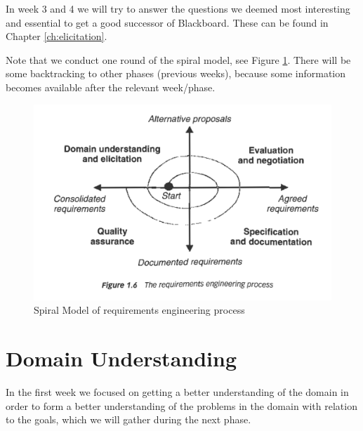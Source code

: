 

In week 3 and 4 we will try to answer the questions we deemed most interesting and essential to get a good successor of Blackboard. These can be found in Chapter \ref{ch:elicitation}.

Note that we conduct one round of the spiral model, see Figure \ref{fig:spiral_model}. There will be some backtracking to other phases (previous weeks), because some information becomes available after the relevant week/phase. 

\begin{figure}[h]
	\centering
	\includegraphics[width=0.75\linewidth]{images/re_process}
	\caption{Spiral Model of requirements engineering process}
	\label{fig:spiral_model}
\end{figure}


\chapter{Domain Understanding}
In the first week we focused on getting a better understanding of the domain in order to form a better understanding of the problems in the domain with relation to the goals, which we will gather during the next phase.

